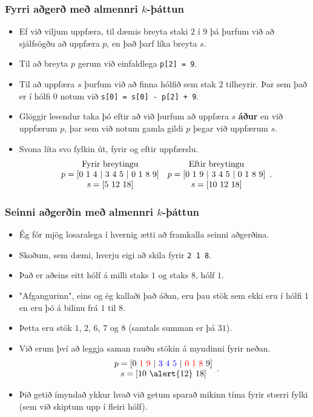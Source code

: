 \documentclass{beamer}
\begin{document}
\begin{frame}
	\frametitle{Fyrri aðgerð með almennri $k$-þáttun}
\begin{itemize}
	\item<1-> Ef við viljum uppfæra, til dæmis breyta staki $2$ í $9$ þá þurfum við að sjálfsögðu að uppfæra
		$p$, en það þarf líka breyta $s$.
	\item<2-> Til að breyta $p$ gerum við einfaldlega \texttt{p[2] = 9}.
	\item<3-> Til að uppfæra $s$ þurfum við að finna hólfið sem stak $2$ tilheyrir. Þar sem það er í hólfi $0$
		notum við \texttt{s[0] = s[0] - p[2] + 9}.
	\item<4-> Glöggir lesendur taka þó eftir að við þurfum að uppfæra $s$ {\bf áður} en við uppfærum $p$, þar sem
		við notum gamla gildi $p$ þegar við uppfærum $s$.
	\item<5-> Svona líta svo fylkin út, fyrir og eftir uppfærslu.
		\[
		\begin {array}{c c}
		\text{Fyrir breytingu} & \text{Eftir breytingu}\\
			p = [0\ 1\ 4\ |\ 3\ 4\ 5\ |\ 0\ 1\ 8\ 9] & p = [0\ 1\ 9\ |\ 3\ 4\ 5\ |\ 0\ 1\ 8\ 9]\\
			s = [5\ 12\ 18] & s = [10\ 12\ 18]
		\end {array}.
		\]
\end{itemize}
\end{frame}

\begin{frame}
	\frametitle{Seinni aðgerðin með almennri $k$-þáttun}
\begin{itemize}
	\item<1-> Ég fór mjög losaralega í hvernig ætti að framkalla seinni aðgerðina.
	\item<2-> Skoðum, sem dæmi, hverju eigi að skila fyrir \texttt{2 1 8}.
	\item<3-> Það er aðeins eitt hólf á milli staks $1$ og staks $8$, hólf $1$.
	\item<4-> "Afgangurinn", eins og ég kallaði það áðan, eru þau stök sem ekki eru í hólfi $1$
		en eru þó á bilinu frá $1$ til $8$.
	\item<5-> Þetta eru stök $1$, $2$, $6$, $7$ og $8$ (samtals summan er þá $31$).
	\item<6-> Við erum því að leggja saman rauðu stökin á myndinni fyrir neðan.
		\[
		\begin {array}{c}
			p = [0\ {\color{red} 1 \ 9\ }|\ {\color{blue}3\ 4\ 5\ } |\ {\color{red} 0\ 1\ 8\ } 9]\\ 
			s = [10\ \alert{12}\ 18]
		\end {array}.
		\]
	\item<7-> Þið getið ímyndað ykkur hvað við getum sparað mikinn tíma fyrir stærri fylki (sem
		við skiptum upp í fleiri hólf).
\end{itemize}
\end{frame}
\end{document}
